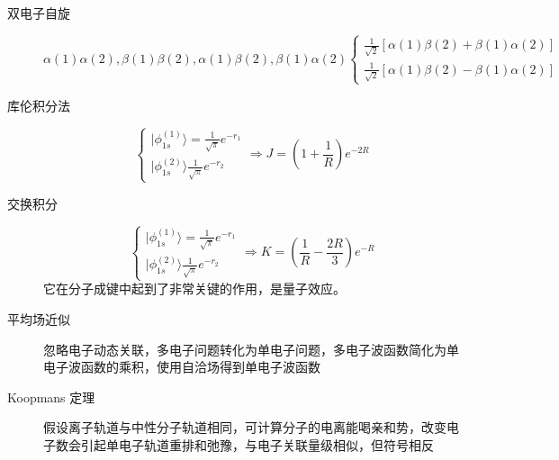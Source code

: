 \documentclass{article}
\numberwithin{equation}{section}
\newcommand{\ket}[1]{| #1 \rangle}
\begin{document}
\begin{description}
	\item[双电子自旋]
	\begin{equation}
	\alpha(1)\alpha(2),\beta(1)\beta(2),\alpha(1)\beta(2),\beta(1)\alpha(2)
	\begin{cases}
	\frac{1}{\sqrt{2}}[\alpha(1)\beta(2)+\beta(1)\alpha(2)]\\
	\frac{1}{\sqrt{2}}[\alpha(1)\beta(2)-\beta(1)\alpha(2)]
	\end{cases}
	\end{equation}

\end{description}
  \begin{description}
	\item[库伦积分法]
	\begin{equation}
	\begin{cases}
	\ket{\phi_{1s}^{(1)}}=\frac{1}{\sqrt{\pi}}e^{-r_1}\\
	\ket{\phi_{1s}^{(2)}}\frac{1}{\sqrt{\pi}}e^{-r_2}
	\end{cases}
	\Rightarrow J=(1+\frac{1}{R})e^{-2R}
	\end{equation}

	\item[交换积分]
	\begin{equation}
	\begin{cases}
	\ket{\phi_{1s}^{(1)}}=\frac{1}{\sqrt{\pi}}e^{-r_1}\\
	\ket{\phi_{1s}^{(2)}}\frac{1}{\sqrt{\pi}}e^{-r_2}
	\end{cases}
	\Rightarrow K=(\frac{1}{R}-\frac{2R}{3})e^{-R}
	\end{equation}
	它在分子成键中起到了非常关键的作用，是量子效应。
\end{description}

\begin{description}
	\item[平均场近似] 忽略电子动态关联，多电子问题转化为单电子问题，多电子波函数简化为单电子波函数的乘积，使用自洽场得到单电子波函数

	\item[Koopmans 定理]假设离子轨道与中性分子轨道相同，可计算分子的电离能喝亲和势，改变电子数会引起单电子轨道重排和弛豫，与电子关联量级相似，但符号相反
\end{description}
\end{document}
